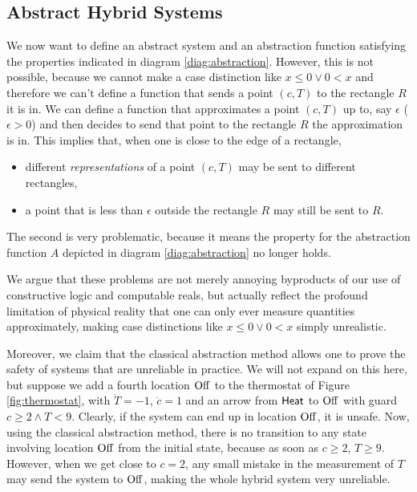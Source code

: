 \documentclass[runningheads]{llncs}
\newcommand{\DN}{{\sf DN}\,}
\newcommand{\Heat}{{\sf Heat}}
\newcommand{\Off}{{\rm Off}}
\newcommand{\State}{{\rm State}}
\newcommand{\Unsafe}{{\rm Unsafe}}
\newcommand{\Reach}{{\rm Reach}}
\begin{document}

\subsection{Abstract Hybrid Systems}
\label{abshybsys}
\label{abstraction}
We now want to define an abstract system and an abstraction function
satisfying the properties indicated in diagram
\ref{diag:abstraction}. However, this is not possible, because we
cannot make a case distinction like $x\leq 0 \vee 0< x$ and therefore
we can't define a function that sends a point $(c,T)$ to the rectangle $R$
it is in. We can define a function that approximates a point $(c,T)$
up to, say $\epsilon$ ($\epsilon >0$) and then decides to send that
point to the rectangle $R$ the approximation is in. This implies that,
when one is close to the edge of a rectangle,
\begin{itemize}
\item 
different {\em representations\/} of a point $(c,T)$ may be
sent to different rectangles,
\item
a point that is less than $\epsilon$ outside the rectangle $R$ may still be sent to $R$.
\end{itemize}
The second is very problematic, because it means the property for the
abstraction function $A$ depicted in diagram
\ref{diag:abstraction} no longer holds.

We argue that these problems are not merely annoying byproducts
of our use of constructive logic and computable reals, but actually
reflect the profound limitation of physical reality that one can only
ever measure quantities approximately, making case distinctions like
$x\leq 0 \vee 0< x$ simply unrealistic.

Moreover, we claim that the
classical abstraction method allows one to prove the safety of systems
that are unreliable in practice. We will not expand on this here, but
suppose we add a fourth location $\Off$ to the thermostat of Figure
\ref{fig:thermostat}, with $\dot{T} = -1$, $\dot{c} =1$ and an arrow
from $\Heat$ to $\Off$ with guard $c\geq 2 \wedge T<9$. Clearly, if
the system can end up in location $\Off$, it is unsafe. Now, using
the classical abstraction method, there is no transition to any state
involving location $\Off$ from the initial state, because as soon as
$c\geq 2$, $T\geq 9$. However, when we get close to $c=2$, any small
mistake in the measurement of $T$ may send the system to $\Off$,
making the whole hybrid system very unreliable.
\end{document}
